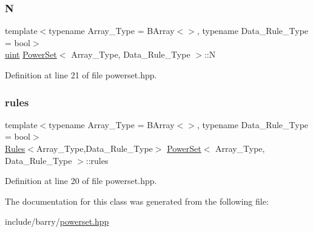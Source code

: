 \subsubsection{\texorpdfstring{N}{N}}
{\footnotesize\ttfamily template$<$typename Array\+\_\+\+Type  = B\+Array$<$$>$, typename Data\+\_\+\+Rule\+\_\+\+Type  = bool$>$ \\
\hyperlink{typedefs_8hpp_a91ad9478d81a7aaf2593e8d9c3d06a14}{uint} \hyperlink{class_power_set}{Power\+Set}$<$ Array\+\_\+\+Type, Data\+\_\+\+Rule\+\_\+\+Type $>$\+::N}



Definition at line 21 of file powerset.\+hpp.

\mbox{\label{class_power_set_afde1de561c80f2d0064ba6267aef2edd}} 
\subsubsection{\texorpdfstring{rules}{rules}}
{\footnotesize\ttfamily template$<$typename Array\+\_\+\+Type  = B\+Array$<$$>$, typename Data\+\_\+\+Rule\+\_\+\+Type  = bool$>$ \\
\hyperlink{class_rules}{Rules}$<$Array\+\_\+\+Type,Data\+\_\+\+Rule\+\_\+\+Type$>$ \hyperlink{class_power_set}{Power\+Set}$<$ Array\+\_\+\+Type, Data\+\_\+\+Rule\+\_\+\+Type $>$\+::rules}



Definition at line 20 of file powerset.\+hpp.



The documentation for this class was generated from the following file\+:\begin{DoxyCompactItemize}
\item 
include/barry/\hyperlink{powerset_8hpp}{powerset.\+hpp}\end{DoxyCompactItemize}
